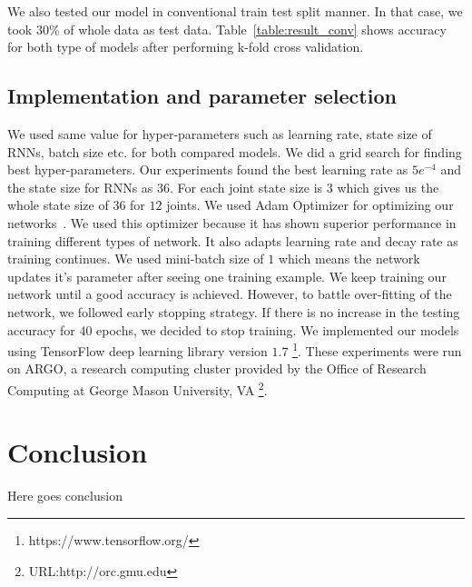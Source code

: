 \documentclass[10pt,twocolumn,letterpaper]{article}
\begin{document}
We also tested our model in conventional train test split manner. In that case, we took $30\%$ of whole data as test data. Table~\ref{table:result_conv} shows accuracy for both type of models after performing k-fold cross validation.

 
\subsection{Implementation and parameter selection}
We used same value for hyper-parameters such as learning rate, state size of RNNs, batch size etc. for both compared models. We did a grid search for finding best hyper-parameters. Our experiments found the best learning rate as $5e^{-4}$ and the state size for RNNs as $36$. For each joint state size is $3$ which gives us the whole state size of $36$ for $12$ joints. We used Adam Optimizer for optimizing our networks~\cite{DBLP:journals/corr/KingmaB14}. We used this optimizer because it has shown superior performance in training different types of network. It also adapts learning rate and decay rate as training continues. We used mini-batch size of $1$ which means the network updates it's parameter after seeing one training example. We keep training our network until a good accuracy is achieved. However, to battle over-fitting of the network, we followed early stopping strategy. If there is no increase in the testing accuracy for $40$ epochs, we decided to stop training. We implemented our models using TensorFlow deep learning library version $1.7$ \footnote{https://www.tensorflow.org/}. These experiments were run on ARGO, a research computing cluster provided by the Office of Research Computing at George Mason University, VA \footnote{URL:http://orc.gmu.edu}. 

\section{Conclusion}
Here goes conclusion




{\small


}
\end{document}
